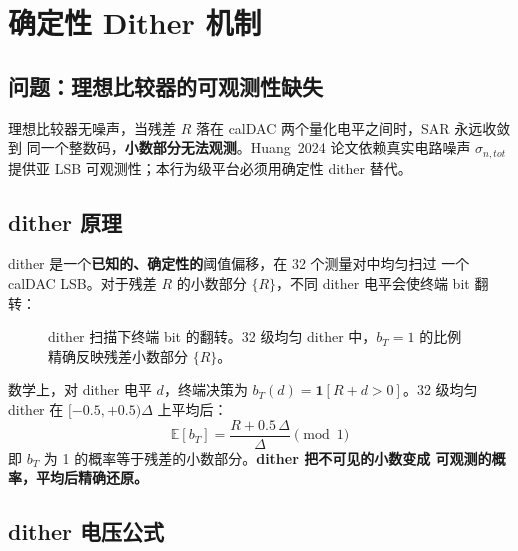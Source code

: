 \documentclass[UTF8,a4paper,11pt,twoside]{ctexrep}
\begin{document}
\chapter{确定性 Dither 机制}

\section{问题：理想比较器的可观测性缺失}

理想比较器无噪声，当残差 $R$ 落在 calDAC 两个量化电平之间时，SAR 永远收敛到
同一个整数码，\textbf{小数部分无法观测}。Huang~2024 论文依赖真实电路噪声
$\sigma_{n,tot}$ 提供亚 LSB 可观测性；本行为级平台必须用确定性 dither 替代。

\section{dither 原理}

dither 是一个\textbf{已知的、确定性的}阈值偏移，在 32 个测量对中均匀扫过
一个 calDAC LSB。对于残差 $R$ 的小数部分 $\{R\}$，不同 dither 电平会使终端
bit 翻转：

\begin{figure}[ht]\centering
{}
\caption{dither 扫描下终端 bit 的翻转。32 级均匀 dither 中，$b_T=1$ 的比例
精确反映残差小数部分 $\{R\}$。}
\label{fig:dither}
\end{figure}

数学上，对 dither 电平 $d$，终端决策为 $b_T(d)=\mathbf{1}[R+d>0]$。32 级均匀
dither 在 $[-0.5,+0.5)\Delta$ 上平均后：
\[
\mathbb{E}[b_T] = \frac{R + 0.5\,\Delta}{\Delta} \pmod 1
\]
即 $b_T$ 为 1 的概率等于残差的小数部分。\textbf{dither 把不可见的小数变成
可观测的概率，平均后精确还原。}

\section{dither 电压公式}
\end{document}
